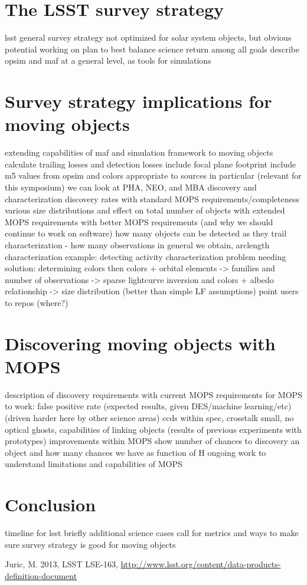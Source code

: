 \documentclass{iau}
\begin{document}
\section{The LSST survey strategy}
lsst general survey strategy
not optimized for solar system objects, but obvious potential
working on plan to best balance science return among all goals
describe opsim and maf at a general level, as tools for simulations

\section{Survey strategy implications for moving objects}
extending capabilities of maf and simulation framework to moving
objects
calculate trailing losses and detection losses
include focal plane footprint
include m5 values from opsim and colors appropriate to sources
in particular (relevant for this symposium) we can look at PHA, NEO,
and MBA discovery and characterization
discovery rates with standard MOPS requirements/completeness
 various size distributions and effect on total number of objects
with extended MOPS requirements
with better MOPS requirements (and why we should continue to work on software)
how many objects can be detected as they trail
characterization - how many observations in general we obtain,
arclength
characterization example: detecting activity
characterization problem needing solution: determining colors
then colors + orbital elements -> families
and number of observations -> sparse lightcurve inversion
and colors + albedo relationship -> size distribution (better than
simple LF assumptions)
point users to repos (where?)

\section{Discovering moving objects with MOPS}
description of discovery requirements with current MOPS
requirements for MOPS to work:
 false positive rate (expected results, given DES/machine
 learning/etc) (driven harder here by other science areas)
   ccds within spec, crosstalk small, no optical ghosts, 
 capabilities of linking objects (results of previous experiments with
 prototypes)  improvements within MOPS
show number of chances to discovery an object and how many chances we
have as function of H 
ongoing work to understand limitations and capabilities of MOPS

\section{Conclusion}
timeline for lsst
briefly additional science cases
call for metrics and ways to make sure survey strategy is good for
moving objects



\begin{thebibliography}{}

{Juric, M.} 2013, LSST LSE-163,
\url{http://www.lsst.org/content/data-products-definition-document}

\end{thebibliography}

\end{document}

